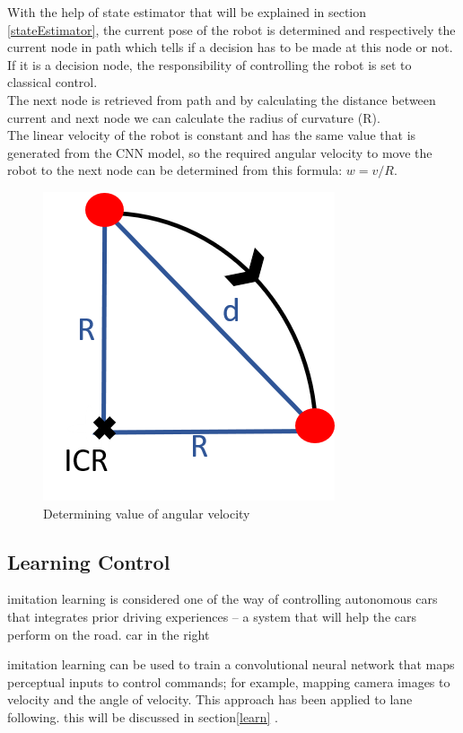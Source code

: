 With the help of state estimator that will be explained in section \ref{stateEstimator}, the current pose of the robot is determined and respectively the current node in path which tells if a decision has to be made at this node or not. If it is a decision node, the responsibility of controlling the robot is set to classical control.\\
The next node is retrieved from path and by calculating the distance between current and next node we can calculate the radius of curvature (R). \\
The linear velocity of the robot is constant and has the same value that is generated from the CNN model, so the required angular velocity to move the robot to the next node can be determined from this formula: $ w = v / R$.\\

\begin{figure}[H]%
    \center%
    \includegraphics[width=.3\textwidth]
    {images/Alzahraa/classical.png}%
    \caption[Classical Control]{Determining value of angular velocity}\label{fig:w calculation}%
  \end{figure}

\subsection{Learning Control}
\hspace{2cm} imitation learning is considered one of the way of controlling autonomous cars that integrates prior driving experiences – a system that will help the cars perform on the road.
 car in the right

imitation learning can be used to train a convolutional neural network that maps perceptual inputs to
control commands; for example, mapping camera images to
velocity and the angle of velocity. This approach has been applied to lane following.
this will be discussed in section\ref{learn} .

